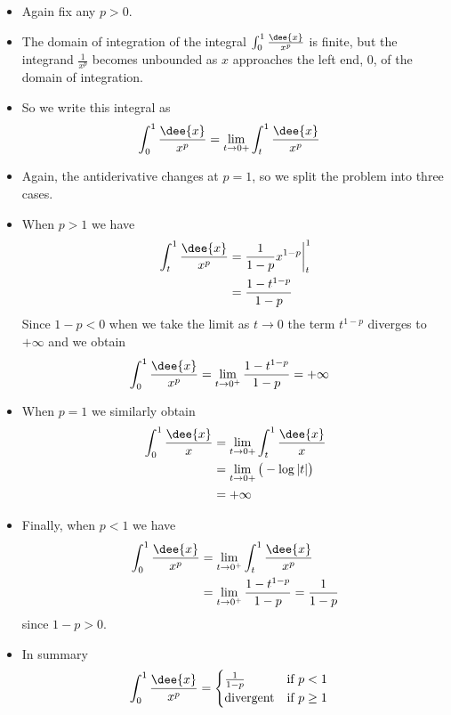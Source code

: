 \begin{eg}\label{eg:IMPp2}
\soln
\begin{itemize}
  \item Again fix any $p>0$.
  \item The domain of integration of the integral  $\int_0^1\frac{\dee{x}}{x^p}$ is
finite, but the integrand $\frac{1}{x^p}$ becomes unbounded as $x$ approaches the left
end, $0$, of the domain of integration.
\item So we write this integral as
\begin{align*}
\int_0^1\frac{\dee{x}}{x^p}
&=\lim_{t\rightarrow 0+} \int_t^1\frac{\dee{x}}{x^p}
\end{align*}
\item Again, the antiderivative changes at $p=1$, so we split the problem into three
cases.
\item When $p>1$ we have
\begin{align*}
  \int_t^1\frac{\dee{x}}{x^p}
  &= \frac{1}{1-p}x^{1-p}\bigg|_t^1 \\
  &= \frac{1-t^{1-p}}{1-p}
\end{align*}
Since $1-p<0$ when we take the limit as $t\to 0$ the term $t^{1-p}$ diverges to
$+\infty$ and we obtain
\begin{align*}
  \int_0^1\frac{\dee{x}}{x^p}
  &= \lim_{t\to0^+} \frac{1-t^{1-p}}{1-p} = +\infty
\end{align*}
\item When $p=1$ we similarly obtain
\begin{align*}
  \int_0^1\frac{\dee{x}}{x}
&= \lim_{t\to0+} \int_t^1\frac{\dee{x}}{x}\\
&= \lim_{t\to0+} \big( -\log|t| \big) \\
&= +\infty
\end{align*}
\item Finally, when $p<1$ we have
\begin{align*}
  \int_0^1\frac{\dee{x}}{x^p}
&= \lim_{t\to0^+}\int_t^1\frac{\dee{x}}{x^p}\\
&= \lim_{t\to0^+} \frac{1-t^{1-p}}{1-p} = \frac{1}{1-p}
\end{align*}
since $1-p>0$.

\item In summary
\begin{align*}
\int_0^1\frac{\dee{x}}{x^p}
&=\begin{cases}
   \frac{1}{1-p} & \text{if } p<1 \\
   \text{divergent} & \text {if } p\ge 1
  \end{cases}
\end{align*}
\end{itemize}
\end{eg}



